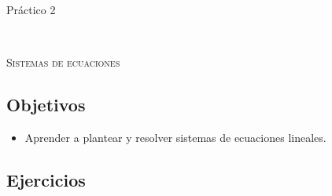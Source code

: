 \documentclass[12pt]{amsart}
\begin{document}



\centerline{\Large{Pr\' actico 2}}

\

\centerline{\textsc{Sistemas de ecuaciones}}


\bigbreak



\subsection*{Objetivos}

\begin{itemize}
 \item Aprender a plantear y resolver sistemas de ecuaciones lineales.
\end{itemize}

\smallskip

\subsection*{Ejercicios}
\end{document}
